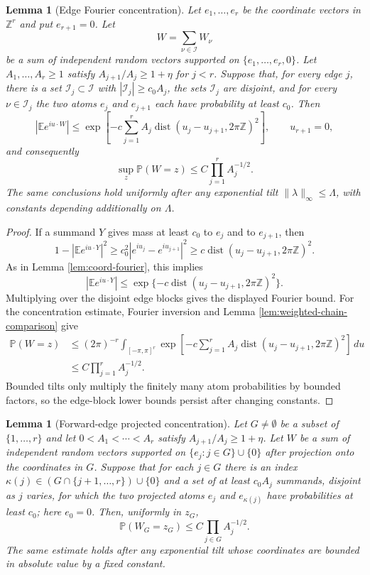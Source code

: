\documentclass[11pt]{article}
\newtheorem{lemma}[theorem]{Lemma}
\theoremstyle{remark}
\newcommand{\Pp}{\mathbb P}
\newcommand{\Ee}{\mathbb E}
\newcommand{\dd}{\,d}
\begin{document}
\begin{lemma}[Edge Fourier concentration]\label{lem:edge-fourier}
Let $e_1,\ldots,e_r$ be the coordinate vectors in $\mathbb Z^r$ and put $e_{r+1}=0$.  Let
\[
        W=\sum_{\nu\in\mathcal I}W_\nu
\]
be a sum of independent random vectors supported on
$\{e_1,\ldots,e_r,0\}$.  Let $A_1,\ldots,A_r\ge1$ satisfy
$A_{j+1}/A_j\ge1+\eta$ for $j<r$.  Suppose that, for every edge $j$, there is a set
$\mathcal I_j\subset\mathcal I$ with $|\mathcal I_j|\ge c_0A_j$, the sets $\mathcal I_j$ are disjoint, and for every $\nu\in\mathcal I_j$ the two atoms $e_j$ and $e_{j+1}$ each have probability at least $c_0$.  Then
\[
        |\Ee e^{iu\cdot W}|
        \le \exp\left[-c\sum_{j=1}^r
        A_j\operatorname{dist}(u_j-u_{j+1},2\pi\mathbb Z)^2\right],
        \qquad u_{r+1}=0,
\]
and consequently
\[
        \sup_z\Pp(W=z)\le C\prod_{j=1}^r A_j^{-1/2}.
\]
The same conclusions hold uniformly after any exponential tilt
$\|\lambda\|_\infty\le\Lambda$, with constants depending additionally on
$\Lambda$.
\end{lemma}

\begin{proof}
If a summand $Y$ gives mass at least $c_0$ to $e_j$ and to $e_{j+1}$, then
\[
        1-|\Ee e^{iu\cdot Y}|^2
        \ge c_0^2|e^{iu_j}-e^{iu_{j+1}}|^2
        \ge c\operatorname{dist}(u_j-u_{j+1},2\pi\mathbb Z)^2 .
\]
As in Lemma \ref{lem:coord-fourier}, this implies
\[
        |\Ee e^{iu\cdot Y}|
        \le \exp\{-c\operatorname{dist}(u_j-u_{j+1},2\pi\mathbb Z)^2\}.
\]
Multiplying over the disjoint edge blocks gives the displayed Fourier bound.
For the concentration estimate, Fourier inversion and Lemma
\ref{lem:weighted-chain-comparison} give
\[
\begin{aligned}
        \Pp(W=z)
        &\le (2\pi)^{-r}\int_{[-\pi,\pi]^r}
        \exp\left[-c\sum_{j=1}^r A_j
        \operatorname{dist}(u_j-u_{j+1},2\pi\mathbb Z)^2\right]\dd u \\
        &\le C\prod_{j=1}^r A_j^{-1/2}.
\end{aligned}
\]
Bounded tilts only multiply the finitely many atom probabilities by bounded factors, so the edge-block lower bounds persist after changing constants.
\end{proof}

\begin{lemma}[Forward-edge projected concentration]\label{lem:projected-forward-edge-concentration}
Let $G\ne\emptyset$ be a subset of $\{1,\ldots,r\}$ and let
$0<A_1<\cdots<A_r$ satisfy $A_{j+1}/A_j\ge1+\eta$.
Let $W$ be a sum of independent random vectors supported on
$\{e_j:j\in G\}\cup\{0\}$ after projection onto the coordinates in $G$.
Suppose that for each $j\in G$ there is an index
$\kappa(j)\in (G\cap\{j+1,\ldots,r\})\cup\{0\}$ and a set of at
least $c_0A_j$ summands, disjoint as $j$ varies, for which the two
projected atoms $e_j$ and $e_{\kappa(j)}$ have probabilities at least
$c_0$; here $e_0=0$.  Then, uniformly in $z_G$,
\[
        \Pp(W_G=z_G)\le C\prod_{j\in G} A_j^{-1/2}.
\]
The same estimate holds after any exponential tilt whose coordinates are
bounded in absolute value by a fixed constant.
\end{lemma}
\end{document}
